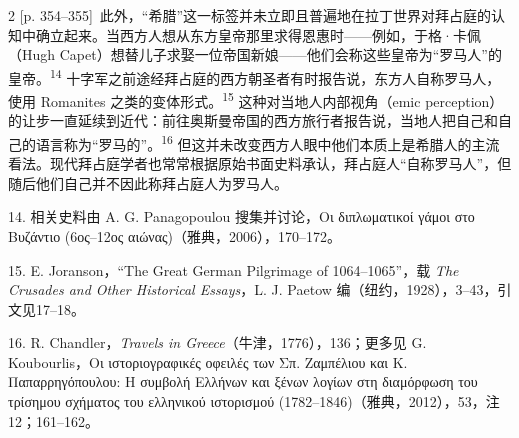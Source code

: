 \documentclass[10pt,a4paper]{article}
\begin{document}
\begin{paracol}{2}
{\scriptsize\color{gray}[p. 354–355]}\ 此外，“希腊”这一标签并未立即且普遍地在拉丁世界对拜占庭的认知中确立起来。当西方人想从东方皇帝那里求得恩惠时——例如，于格·卡佩（Hugh Capet）想替儿子求娶一位帝国新娘——他们会称这些皇帝为“罗马人”的皇帝。\nobreak\textsuperscript{14} 十字军之前途经拜占庭的西方朝圣者有时报告说，东方人自称罗马人，使用 Romanites 之类的变体形式。\nobreak\textsuperscript{15} 这种对当地人内部视角（emic perception）的让步一直延续到近代：前往奥斯曼帝国的西方旅行者报告说，当地人把自己和自己的语言称为“罗马的”。\nobreak\textsuperscript{16} 但这并未改变西方人眼中他们本质上是希腊人的主流看法。现代拜占庭学者也常常根据原始书面史料承认，拜占庭人“自称罗马人”，但随后他们自己并不因此称拜占庭人为罗马人。\par{\small 14. 相关史料由 A. G. Panagopoulou 搜集并讨论，Οι διπλωματικοί γάμοι στο Βυζάντιο (6ος–12ος αιώνας)（雅典，2006），170–172。\par}{\small 15. E. Joranson，“The Great German Pilgrimage of 1064–1065”，载 \textit{The Crusades and Other Historical Essays}，L. J. Paetow 编（纽约，1928），3–43，引文见17–18。\par}{\small 16. R. Chandler，\textit{Travels in Greece}（牛津，1776），136；更多见 G. Koubourlis，Οι ιστοριογραφικές οφειλές των Σπ. Ζαμπέλιου και Κ. Παπαρρηγόπουλου: Η συμβολή Ελλήνων και ξένων λογίων στη διαμόρφωση του τρίσημου σχήματος του ελληνικού ιστορισμού (1782–1846)（雅典，2012），53，注12；161–162。\par}
\switchcolumn

\end{paracol}
\end{document}
